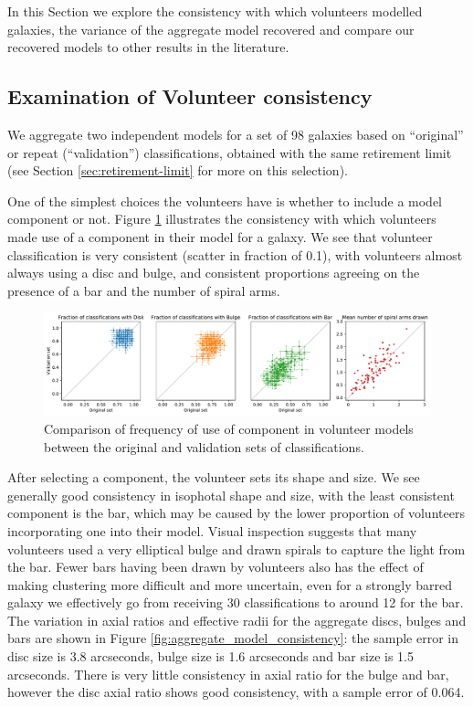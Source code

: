 \documentclass[../main.tex]{subfiles}
\begin{document}
\label{sec:results}

In this Section we explore the consistency with which volunteers modelled galaxies, the variance of the aggregate model recovered and compare our recovered models to other results in the literature.

\subsection{Examination of Volunteer consistency}
We aggregate two independent models for a set of 98 galaxies based on ``original'' or repeat (``validation'') classifications, obtained with the same retirement limit (see Section \ref{sec:retirement-limit} for more on this selection).

One of the simplest choices the volunteers have is whether to include a model component or not. Figure \ref{fig:volunteer_component_consistency} illustrates the consistency with which volunteers made use of a component in their model for a galaxy. We see that volunteer classification is very consistent (scatter in fraction of 0.1), with volunteers almost always using a disc and bulge, and consistent proportions agreeing on the presence of a bar and the number of spiral arms.

\begin{figure}
  \includegraphics[width=17.3cm]{images__results/component_frequency.pdf}
  \caption{Comparison of frequency of use of component in volunteer models between the original and validation sets of classifications.}
  \label{fig:volunteer_component_consistency}
\end{figure}

After selecting a component, the volunteer sets its shape and size. We see generally good consistency in isophotal shape and size, with the least consistent component is the bar, which may be caused by the lower proportion of volunteers incorporating one into their model. Visual inspection suggests that many volunteers used a very elliptical bulge and drawn spirals to capture the light from the bar. Fewer bars having been drawn by volunteers also has the effect of making clustering more difficult and more uncertain, even for a strongly barred galaxy we effectively go from receiving 30 classifications to around 12 for the bar. The variation in axial ratios and effective radii for the aggregate discs, bulges and bars are shown in Figure \ref{fig:aggregate_model_consistency}: the sample error in disc size is 3.8 arcseconds, bulge size is 1.6 arcseconds and bar size is 1.5 arcseconds. There is very little consistency in axial ratio for the bulge and bar, however the disc axial ratio shows good consistency, with a sample error of 0.064.
\end{document}
